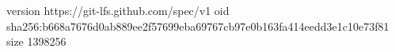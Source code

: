 version https://git-lfs.github.com/spec/v1
oid sha256:b668a7676d0ab889ee2f57699eba69767cb97e0b163fa414eedd3e1c10e73f81
size 1398256
